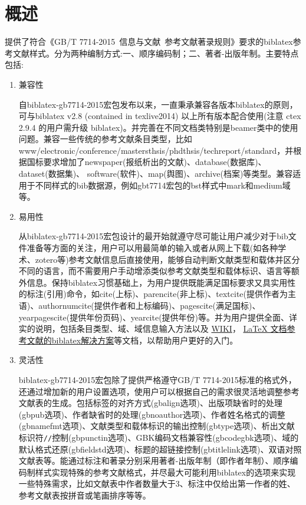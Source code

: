 \section{概述}
提供了符合《GB/T 7714-2015~信息与文献~参考文献著录规则》要求的biblatex参考文献样式。分为两种编制方式:一、顺序编码制；二、著者-出版年制。主要特点包括:
\begin{enumerate}
  \item 兼容性

自biblatex-gb7714-2015宏包发布以来，一直秉承兼容各版本biblatex的原则，可与biblatex v2.8 (contained in texlive2014) 以上所有版本配合使用(注意 ctex 2.9.4 的用户需升级 biblatex)。并完善在不同文档类特别是beamer类中的使用问题。兼容一些传统的参考文献条目类型，比如www/electronic/conference/mastersthsis/phdthsis/techreport/standard，并根据国标要求增加了newspaper(报纸析出的文献)、database(数据库)、dataset(数据集)、 software(软件)、map(舆图)、archive(档案)等类型。兼容适用于不同样式的bib数据源，例如gbt7714宏包的bst样式中mark和medium域等。

  \item 易用性

从biblatex-gb7714-2015宏包设计的最开始就遵守尽可能让用户减少对于bib文件准备等方面的关注，用户可以用最简单的输入或者从网上下载(如各种学术、zotero等)参考文献信息后直接使用，能够自动判断文献类型和载体并区分不同的语言，而不需要用户手动增添类似参考文献类型和载体标识、语言等额外信息。保持biblatex习惯基础上，为用户提供既能满足国标要求又具实用性的标注(引用)命令，如cite(上标)、parencite(非上标)、textcite(提供作者为主语)、authornumcite(提供作者和上标编码)、pagescite(满足国标)、yearpagescite(提供年份页码)、yearcite(提供年份)等。并为用户提供全面、详实的说明，包括条目类型、域、域信息输入方法以及
\href{https://github.com/hushidong/biblatex-gb7714-2015/wiki}{WIKI}，
\href{https://github.com/hushidong/biblatex-solution-to-latex-bibliography/blob/master/biblatex-solution-to-latex-bibliography.pdf}{LaTeX 文档参考文献的biblatex解决方案}等文档，以帮助用户更好的入门。

  \item 灵活性

biblatex-gb7714-2015宏包除了提供严格遵守GB/T 7714-2015标准的格式外，还通过增加新的用户设置选项，使用户可以根据自己的需求很灵活地调整参考文献表的生成。包括标签的对齐方式(gbalign选项)、出版项缺省时的处理(gbpub选项)、作者缺省时的处理(gbnoauthor选项)、作者姓名格式的调整(gbnamefmt选项)、文献类型和载体标识的输出控制(gbtype选项)、析出文献标识符\texttt{//}控制(gbpunctin选项)、GBK编码文档兼容性(gbcodegbk选项)、域的默认格式还原(gbfieldstd选项)、标题的超链接控制(gbtitlelink选项)、双语对照文献表等。能通过标注和著录分别采用著者-出版年制（即作者年制）、顺序编码制样式实现特殊的参考文献格式，并尽最大可能利用biblatex的选项来实现一些特殊需求，比如文献表中作者数量大于3、标注中仅给出第一作者的姓、参考文献表按拼音或笔画排序等等。
\end{enumerate}

